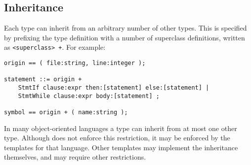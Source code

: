 \subsection{Inheritance}
Each type can inherit from an arbitrary number of other types.
This is specified by prefixing the type definition with a number
of superclass definitions, written as \verb"<superclass> +".
For example:
\begin{verbatim}
origin == ( file:string, line:integer );

statement ::= origin +
    StmtIf clause:expr then:[statement] else:[statement] |
    StmtWhile clause:expr body:[statement] ;

symbol == origin + ( name:string );
\end{verbatim}
In many object-oriented languages a type can inherit from at most one
other type. Although {\Tm} does not enforce this restriction, it may
be enforced by the templates for that language.
Other templates may implement the inheritance themselves, and may
require other restrictions.
